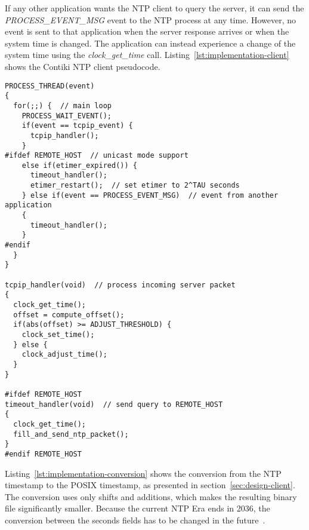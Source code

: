 If any other application wants the NTP client to query the server,
it can send the {\it{PROCESS\_EVENT\_MSG}} event to the NTP process at any time.
However, no event is sent to that application when the server response arrives
or when the system time is changed.
The application can instead experience a change of
the system time using the {\it{clock\_get\_time}} call.
Listing~\ref{lst:implementation-client} shows the Contiki NTP client pseudocode.
\newpage
\begin{lstlisting}[caption={NTP client pseudocode},label={lst:implementation-client}]
PROCESS_THREAD(event)
{
  for(;;) {  // main loop
    PROCESS_WAIT_EVENT();
    if(event == tcpip_event) {
      tcpip_handler();
    }
#ifdef REMOTE_HOST  // unicast mode support
    else if(etimer_expired()) {
      timeout_handler();
      etimer_restart();  // set etimer to 2^TAU seconds
    } else if(event == PROCESS_EVENT_MSG)  // event from another application
    {
      timeout_handler();
    }
#endif
  }
}

tcpip_handler(void)  // process incoming server packet
{
  clock_get_time();
  offset = compute_offset();
  if(abs(offset) >= ADJUST_THRESHOLD) {
    clock_set_time();
  } else {
    clock_adjust_time();
  }
}

#ifdef REMOTE_HOST
timeout_handler(void)  // send query to REMOTE_HOST
{
  clock_get_time();
  fill_and_send_ntp_packet();
}
#endif REMOTE_HOST
\end{lstlisting}

Listing~\ref{lst:implementation-conversion} shows the conversion from the NTP timestamp to the POSIX timestamp,
as presented in section~\ref{sec:design-client}.
The conversion uses only shifts and additions, which makes the resulting binary file
significantly smaller.
Because the current NTP Era ends in 2036,
the conversion between the seconds fields has to be changed in the future~\cite{ntp-y2k}.

